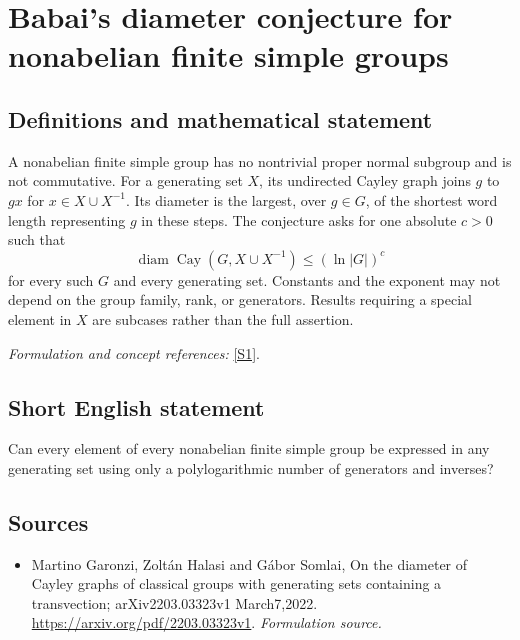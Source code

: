 \documentclass[11pt]{article}
\begin{document}
\section*{\texorpdfstring{Babai's diameter conjecture for nonabelian finite simple groups}{Babai's diameter conjecture for nonabelian finite simple groups}}\label{223}
\subsection{Definitions and mathematical statement}
A nonabelian finite simple group has no nontrivial proper normal subgroup and is not commutative. For a generating set $X$, its undirected Cayley graph joins $g$ to $gx$ for $x\in X\cup X^{-1}$. Its diameter is the largest, over $g\in G$, of the shortest word length representing $g$ in these steps. The conjecture asks for one absolute $c>0$ such that
\[
 \operatorname{diam}\operatorname{Cay}(G,X\cup X^{-1})\le(\ln|G|)^c
\]
for every such $G$ and every generating set. Constants and the exponent may not depend on the group family, rank, or generators. Results requiring a special element in $X$ are subcases rather than the full assertion.
\par\smallskip\textit{Formulation and concept references:} \href{https://arxiv.org/pdf/2203.03323v1}{[S1]}.

\subsection{Short English statement}
Can every element of every nonabelian finite simple group be expressed in any generating set using only a polylogarithmic number of generators and inverses?
\subsection{Sources}
\begin{itemize}
\item[S1]Martino Garonzi, Zoltán Halasi and Gábor Somlai, On the diameter of Cayley graphs of classical groups with generating sets containing a transvection; arXiv2203.03323v1 March7,2022.
\url{https://arxiv.org/pdf/2203.03323v1}.
\textit{Formulation source.}
\end{itemize}
\end{document}
